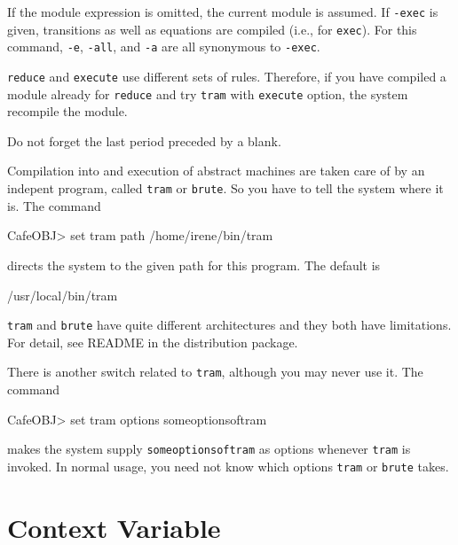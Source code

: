 \documentclass[a4paper]{memoir}
\begin{document}
If the module expression is omitted, the current module is assumed.
If \verb|-exec| is given, transitions as well as equations are
compiled (i.e., for \verb|exec|). For this command,
\verb|-e|, \verb|-all|, and \verb|-a| are all synonymous to \verb|-exec|.

\begin{warning}
  \verb|reduce| and \verb|execute| use different sets of rules.
  Therefore, if you have compiled a module already for \verb|reduce| and
  try \verb|tram| with \verb|execute| option, the system recompile
  the module.
\end{warning}

\begin{warning}
  Do not forget the last period preceded by a blank.
\end{warning}

Compilation into and execution of abstract machines are taken care of
by an indepent program, called \verb|tram| or \verb|brute|. So you have to
tell the system where it is. The command
\begin{vvtm}
\begin{ccode}
  CafeOBJ> set tram path /home/irene/bin/tram
\end{ccode}
\end{vvtm}
directs the system to the given path for this program. The default is
\begin{vvtm}
\begin{ccode}
  /usr/local/bin/tram
\end{ccode}
\end{vvtm}
\verb|tram| and \verb|brute| have quite different architectures and
they both have limitations. For detail, see README in the distribution
package.

There is another switch related to \verb|tram|, although
you may never use it. The command
\begin{vvtm}
\begin{ccode}
  CafeOBJ> set tram options someoptionsoftram
\end{ccode}
\end{vvtm}
makes the system supply \verb|someoptionsoftram| as options whenever
\verb|tram| is invoked. In normal
usage, you need not know which options \verb|tram| or \verb|brute| takes.

\section{Context Variable}\label{sec:p2-let-command}
\end{document}
